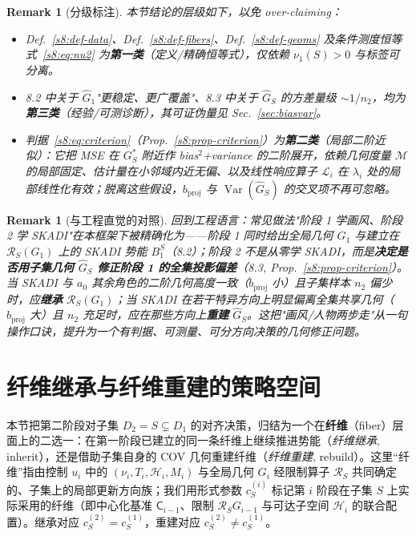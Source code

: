 \documentclass[11pt,a4paper]{article}
\newtheorem{remark}[theorem]{Remark}
\DeclareMathOperator{\Var}{Var}
\newcommand{\cH}{\mathcal{H}}   %
\newcommand{\cL}{\mathcal{L}}   %
\newcommand{\Rstr}{\mathcal{R}}     %
\newcommand{\Center}{\mathsf{C}}    %
\begin{document}
\begin{remark}[分级标注]\label{s8:rem-tier}
本节结论的层级如下，以免 over-claiming：
\begin{itemize}
\item Def.~\ref{s8:def-data}、Def.~\ref{s8:def-fibers}、Def.~\ref{s8:def-geoms} 及条件测度恒等式~\eqref{s8:eq:nu2} 为\textbf{第一类}（定义/精确恒等式），仅依赖 $\nu_1(S)>0$ 与标签可分离。
\item 8.2 中关于 $\widehat G_1$"更稳定、更广覆盖"、8.3 中关于 $\widehat G_S$ 的方差量级 $\sim 1/n_2$，均为\textbf{第三类}（经验/可测诊断），其可证伪量见 Sec.~\ref{sec:biasvar}。
\item 判据~\eqref{s8:eq:criterion}（Prop.~\ref{s8:prop-criterion}）为\textbf{第二类}（局部二阶近似）：它把 MSE 在 $G_S^*$ 附近作 bias$^2$+variance 的二阶展开，依赖几何度量 $\mathcal M$ 的局部固定、估计量在小邻域内近无偏、以及线性响应算子 $\cL_i$ 在 $\lambda_i$ 处的局部线性化有效；脱离这些假设，$b_{\mathrm{proj}}$ 与 $\Var(\widehat G_S)$ 的交叉项不再可忽略。
\end{itemize}
\end{remark}

\begin{remark}[与工程直觉的对照]\label{s8:rem-engineering}
回到工程语言：常见做法"阶段 1 学画风、阶段 2 学 SKADI"在本框架下被精确化为——阶段 1 同时给出全局几何 $G_1$ 与建立在 $\Rstr_S(G_1)$ 上的 SKADI 势能 $B_1^S$（8.2）；阶段 2 不是从零学 SKADI，而是\textbf{决定是否用子集几何 $\widehat G_S$ 修正阶段 1 的全集投影偏差}（8.3, Prop.~\ref{s8:prop-criterion}）。当 SKADI 与 $a_0$ 其余角色的二阶几何高度一致（$b_{\mathrm{proj}}$ 小）且子集样本 $n_2$ 偏少时，应\textbf{继承} $\Rstr_S(G_1)$；当 SKADI 在若干特异方向上明显偏离全集共享几何（$b_{\mathrm{proj}}$ 大）且 $n_2$ 充足时，应在那些方向上\textbf{重建} $\widehat G_S$。这把"画风/人物两步走"从一句操作口诀，提升为一个有判据、可测量、可分方向决策的几何修正问题。
\end{remark}

\section{纤维继承与纤维重建的策略空间}\label{sec:fiber}

本节把第二阶段对子集 $D_2=S\subsetneq D_1$ 的对齐决策，归结为一个在\textbf{纤维}（fiber）层面上的二选一：在第一阶段已建立的同一条纤维上继续推进势能（\emph{纤维继承}, inherit），还是借助子集自身的 COV 几何重建纤维（\emph{纤维重建}, rebuild）。这里“纤维”指由控制 $u_i$ 中的 $(\nu_i,T_i,\cH_i,M_i)$ 与全局几何 $G_i$ 经限制算子 $\Rstr_S$ 共同确定的、子集上的局部更新方向族；我们用形式参数 $c_S^{(i)}$ 标记第 $i$ 阶段在子集 $S$ 上实际采用的纤维（即中心化基准 $\Center_{i-1}$、限制 $\Rstr_S G_{i-1}$ 与可达子空间 $\cH_i$ 的联合配置）。继承对应 $c_S^{(2)}=c_S^{(1)}$，重建对应 $c_S^{(2)}\neq c_S^{(1)}$。
\end{document}
